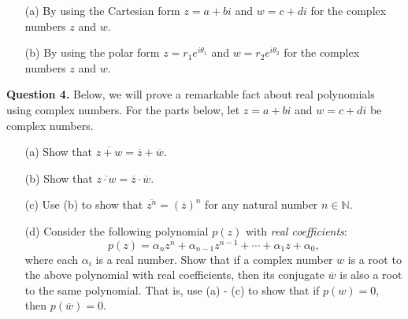 \documentclass[10pt]{report}
\begin{document}
\begin{itemize}

\item[(a)]  By using the Cartesian form $z = a+bi$ and $w = c+di$ for the complex numbers $z$ and $w$.

\item[(b)]  By using the polar form $z = r_1e^{i\theta_1}$ and $w = r_2e^{i \theta_2}$ for the complex numbers $z$ and $w$.  
\end{itemize}

\bigskip

\noindent\textbf{Question 4.}  Below, we will prove a remarkable fact about real polynomials using complex numbers.  For the parts below, let $z = a+bi$ and $w = c+di$ be complex numbers. 

\begin{itemize}

\item[(a)]  Show that $\overline{z+w} = \overline z + \overline w$. 

\item[(b)]  Show that $\overline{z \cdot w} = \overline z \cdot \overline w$.   

\item[(c)]  Use (b) to show that $\overline{z^n} = \left(\overline z\right)^n$ for any natural number $n \in \mathbb N$.  

\item[(d)]  Consider the following polynomial $p(z)$ with \emph{real coefficients}:  $$p(z) = \alpha_nz^n + \alpha_{n-1}z^{n-1} + \cdots + \alpha_1 z + \alpha_0,$$ where each $\alpha_i$ is a real number.  Show that if a complex number $w$ is a root to the above polynomial with real coefficients, then its conjugate $\overline w$ is also a root to the same polynomial.  That is, use (a) - (c) to show that if $p(w) = 0$, then $p(\overline w) = 0$.  

\end{itemize}
\end{document}
